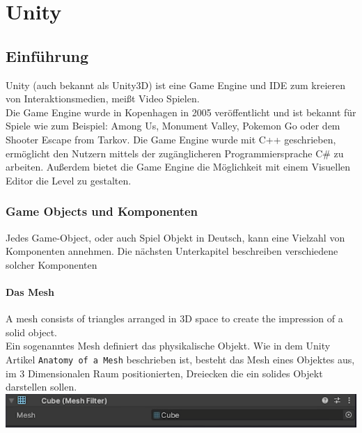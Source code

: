 \pagebreak
{}
\chapter{Unity}

\section{Einführung}
Unity (auch bekannt als Unity3D) ist eine Game Engine und IDE zum kreieren von Interaktionsmedien, meißt Video Spielen. \Cite[][A history of the unity game engine]{haas2014history} \\ %

Die Game Engine wurde in Kopenhagen in 2005 veröffentlicht und ist bekannt für Spiele wie zum Beispiel: Among Us, Monument Valley, Pokemon Go oder dem Shooter Escape from Tarkov. Die Game Engine wurde mit C++ geschrieben, ermöglicht den Nutzern mittels der zugänglicheren Programmiersprache C\# zu arbeiten. Außerdem bietet die Game Engine die Möglichkeit mit einem Visuellen Editor die Level zu gestalten.

\subsection{Game Objects und Komponenten}
Jedes Game-Object, oder auch Spiel Objekt in Deutsch, kann eine Vielzahl von Komponenten annehmen. Die nächsten Unterkapitel beschreiben verschiedene solcher Komponenten

\subsubsection{Das Mesh}
\glqq A mesh consists of triangles arranged in 3D space to create the impression of a solid object. \grqq \Cite[][Anatomy of a Mesh]{unitydoc}\\
Ein sogenanntes Mesh definiert das physikalische Objekt. Wie in dem Unity Artikel \verb+Anatomy of a Mesh+ beschrieben ist, besteht das Mesh eines Objektes aus, im 3 Dimensionalen Raum positionierten, Dreiecken die ein solides Objekt darstellen sollen.\\
\noindent
\includegraphics[width=1\linewidth]{chapters/14/Images/Mesh2.png}

\pagebreak

